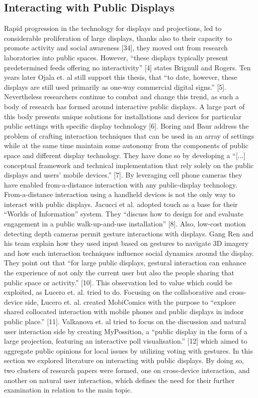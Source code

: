 \subsection{Interacting with Public Displays}

Rapid progression in the technology for displays and projections, led to considerable proliferation of large displays, thanks also to their capacity to promote activity and social awareness [34], they moved out from research laboratories into public spaces. 
However, ``these displays typically present predetermined feeds offering no interactivity'' [4] states Brignull and Rogers. 
Ten years later Ojala et. al still support this thesis, that ``to date, however, these displays are still used primarily as one-way commercial digital signs.'' [5]. 
Nevertheless researchers continue to combat and change this trend, as such a body of research has formed around interactive public displays. 
A large part of this body presents unique  solutions for installations and devices for particular public settings with specific display technology [6].
Boring and Baur address the problem of crafting interaction techniques that can be used in an array of settings while at the same time maintain some autonomy from the components of public space and different display technology. 
They have done so by developing a ``[...] conceptual framework and technical implementation that rely solely on the public displays and users' mobile devices.'' [7]. By  leveraging cell phone cameras they have enabled from-a-distance interaction with any public-display technology.
From-a-distance interaction using a handheld devices is not the only way to interact with public displays. 
Jacucci et al. adopted touch as a base for their ``Worlds of Information'' system. 
They ``discuss how to design for and evaluate engagement in a public walk-up-and-use installation'' [8]. 
Also, low-cost motion detecting depth cameras permit gesture interactions with displays. 
Gang Ren and his team explain how they used input based on gestures to navigate 3D imagery and how such interaction techniques influence social dynamics around the display. 
They point out that ``for large public displays, gestural interaction can enhance the experience of not only the current user but also the people sharing that public space or activity.'' [10].
This observation led to value which could be exploited, as Lucero et. al. tried to do. 
Focusing on the collaborative and cross-device side, Lucero et. al. created MobiComics with the purpose to ``explore shared collocated interaction with mobile phones and public displays in indoor public place.'' [11]. 
Valkanova et. al tried to focus on the discussion and natural user interaction side by creating MyPossition, a ``public display in the form of a large projection, featuring an interactive poll visualisation.'' [12] which aimed to aggregate public opinions for local issues by utilizing voting with gestures.
In this section we explored literature on interacting with public displays. 
By doing so, two clusters of research papers were formed, one on cross-device interaction, and another on natural user interaction, which defines the need for their further examination in relation to the main topic.